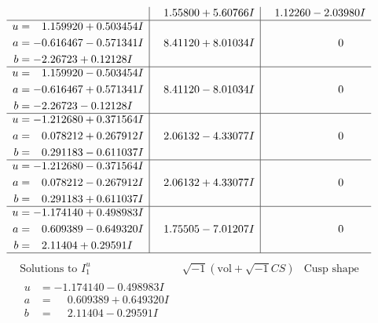 \documentclass[1p]{elsarticle_modified}
\theoremstyle{definition}
\newcommand{\I}{\sqrt{-1}}
\begin{document}
$$\begin{array}{c|c|c}
 & \phantom{-}1.55800 + 5.60766 I & \phantom{-}1.12260 - 2.03980 I \\ \hline\begin{aligned}
u &= \phantom{-}1.159920 + 0.503454 I \\
a &= -0.616467 - 0.571341 I \\
b &= -2.26723 + 0.12128 I\end{aligned}
 & \phantom{-}8.41120 + 8.01034 I & \phantom{-0.000000 } 0 \\ \hline\begin{aligned}
u &= \phantom{-}1.159920 - 0.503454 I \\
a &= -0.616467 + 0.571341 I \\
b &= -2.26723 - 0.12128 I\end{aligned}
 & \phantom{-}8.41120 - 8.01034 I & \phantom{-0.000000 } 0 \\ \hline\begin{aligned}
u &= -1.212680 + 0.371564 I \\
a &= \phantom{-}0.078212 + 0.267912 I \\
b &= \phantom{-}0.291183 - 0.611037 I\end{aligned}
 & \phantom{-}2.06132 - 4.33077 I & \phantom{-0.000000 } 0 \\ \hline\begin{aligned}
u &= -1.212680 - 0.371564 I \\
a &= \phantom{-}0.078212 - 0.267912 I \\
b &= \phantom{-}0.291183 + 0.611037 I\end{aligned}
 & \phantom{-}2.06132 + 4.33077 I & \phantom{-0.000000 } 0 \\ \hline\begin{aligned}
u &= -1.174140 + 0.498983 I \\
a &= \phantom{-}0.609389 - 0.649320 I \\
b &= \phantom{-}2.11404 + 0.29591 I\end{aligned}
 & \phantom{-}1.75505 - 7.01207 I & \phantom{-0.000000 } 0\\
 \hline 
 \end{array}$$\newpage$$\begin{array}{c|c|c}  
\text{Solutions to }I^u_{1}& \I (\text{vol} + \sqrt{-1}CS) & \text{Cusp shape}\\
 \hline 
\begin{aligned}
u &= -1.174140 - 0.498983 I \\
a &= \phantom{-}0.609389 + 0.649320 I \\
b &= \phantom{-}2.11404 - 0.29591 I\end{aligned}

\end{array}$$
\end{document}
